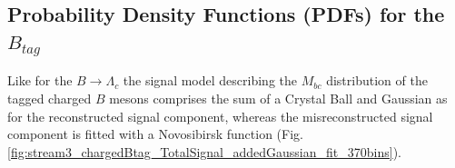             
             

            

\newpage 
\subsection{Probability Density Functions (PDFs) for the $B_{tag}$}
Like for the $B \rightarrow \Lambda_c$  the signal model describing the $M_{bc}$ distribution of the tagged charged $B$ mesons 
comprises the sum of a Crystal Ball and Gaussian as for the reconstructed  signal component, 
whereas the misreconstructed signal component is fitted with a Novosibirsk function (Fig. \ref{fig:stream3_chargedBtag_TotalSignal_addedGaussian_fit_370bins}).
              
